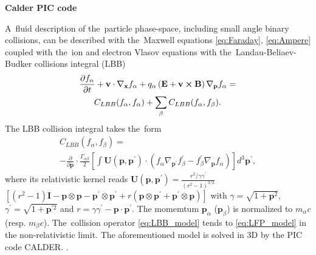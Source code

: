 
\textbf{Calder PIC code}

A~fluid description of the~particle 
phase-space, including small angle binary collisions, can be described with 
the~Maxwell equations \eqref{eq:Faraday}, \eqref{eq:Ampere}
coupled with the~ion and electron Vlasov equations with 
the~Landau-Beliaev-Budker collisions integral (LBB)
\cite{Landau_1936, Beliaev_SPD1956} 
\begin{multline}
\frac{\partial f_\alpha}{\partial t}+\mathbf{v}\cdot\nabla_{\mathbf{x}}f_\alpha+q_\alpha\left(\mathbf{E}+\mathbf{v}\boldsymbol{\times}\mathbf{B}\right)\nabla_{\mathbf{p}}f_\alpha =
\\
C_{LBB}(f_\alpha,f_\alpha)+\sum_\beta C_{LBB}(f_\alpha,f_\beta)
.
\end{multline}
The LBB collision integral takes the~form
\begin{multline}
C_{LBB}(f_\alpha,f_\beta)=
\\
-\frac{\partial}{\partial \mathbf{p}}\cdot\frac{\Gamma_{\alpha\beta}}{2}\left[\int \mathbf{U}(\mathbf{p},\mathbf{p}^\prime)\cdot(f_\alpha\nabla_{\mathbf{p}^\prime}f_\beta^\prime-f_\beta^\prime\nabla_{\mathbf{p}}f_\alpha)\right]d^3\mathbf{p}^\prime
,
\label{eq:LBB_model}
\end{multline}
where its relativistic kernel reads
$\mathbf{U}(\mathbf{p},\mathbf{p}^\prime)=\frac{r^2/\gamma\gamma^\prime}{(r^2-1)^{3/2}}$ 
$\left[(r^2-1)\mathbf{I}-\mathbf{p}\otimes\mathbf{p}-\mathbf{p}^\prime\otimes\mathbf{p}^\prime+r(\mathbf{p}\otimes\mathbf{p}^\prime+\mathbf{p}^\prime\otimes\mathbf{p})\right]$
with $\gamma=\sqrt{1+\mathbf{p}^2}$, $\gamma^\prime=\sqrt{1+\mathbf{p}^{\prime 2}}$ and $r=\gamma\gamma^\prime-\mathbf{p}\cdot\mathbf{p}^\prime$. 
The momemtum $\mathbf{p}_\alpha$ ($\mathbf{p}_\beta$) is normalized to 
$m_\alpha c$ (resp. $m_\beta c$). The~collision operator \eqref{eq:LBB_model} 
tends to \eqref{eq:LFP_model} in the non-relativistic limit.
The aforementioned model is solved in 3D by the PIC code CALDER. 
\cite{Lefebvre_NF2003, Perez_PoP2012}.

